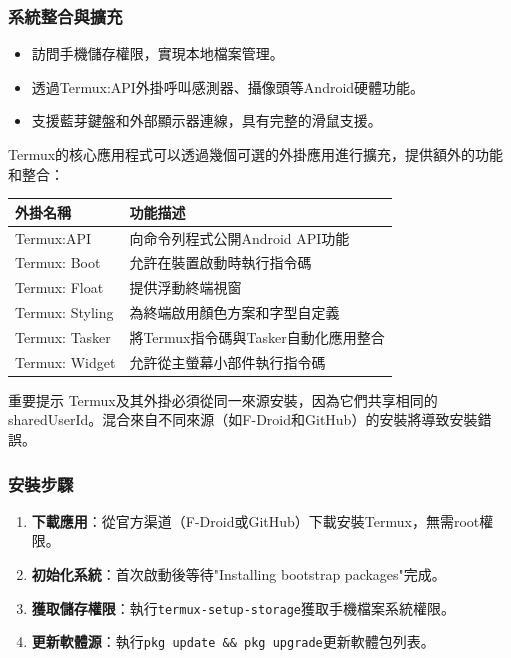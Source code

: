 \subsubsection*{系統整合與擴充}

\begin{itemize}
  \item 訪問手機儲存權限，實現本地檔案管理。
  \item 透過Termux:API外掛呼叫感測器、攝像頭等Android硬體功能。
  \item 支援藍芽鍵盤和外部顯示器連線，具有完整的滑鼠支援。
\end{itemize}


Termux的核心應用程式可以透過幾個可選的外掛應用進行擴充，提供額外的功能和整合：

\begin{center}
\begin{tabularx}{\linewidth}{|X|X|}
\hline
\textbf{外掛名稱} & \textbf{功能描述} \tabularnewline
\hline
Termux:API & 向命令列程式公開Android API功能 \tabularnewline
Termux: Boot & 允許在裝置啟動時執行指令碼 \tabularnewline
Termux: Float & 提供浮動終端視窗 \tabularnewline
Termux: Styling & 為終端啟用顏色方案和字型自定義 \tabularnewline
Termux: Tasker & 將Termux指令碼與Tasker自動化應用整合 \tabularnewline
Termux: Widget & 允許從主螢幕小部件執行指令碼 \tabularnewline
\hline
\end{tabularx}
\end{center}

\begin{tcbwarn}{重要提示}
Termux及其外掛必須從同一來源安裝，因為它們共享相同的sharedUserId。混合來自不同來源（如F-Droid和GitHub）的安裝將導致安裝錯誤。

\end{tcbwarn}


\subsubsection*{安裝步驟}

\begin{enumerate}
  \item \textbf{下載應用}：從官方渠道（F-Droid或GitHub）下載安裝Termux，無需root權限。
  \item \textbf{初始化系統}：首次啟動後等待"Installing bootstrap packages"完成。
  \item \textbf{獲取儲存權限}：執行\texttt{termux-\allowbreak setup-\allowbreak storage}獲取手機檔案系統權限。
  \item \textbf{更新軟體源}：執行\texttt{pkg update \&\& pkg upgrade}更新軟體包列表。
\end{enumerate}

